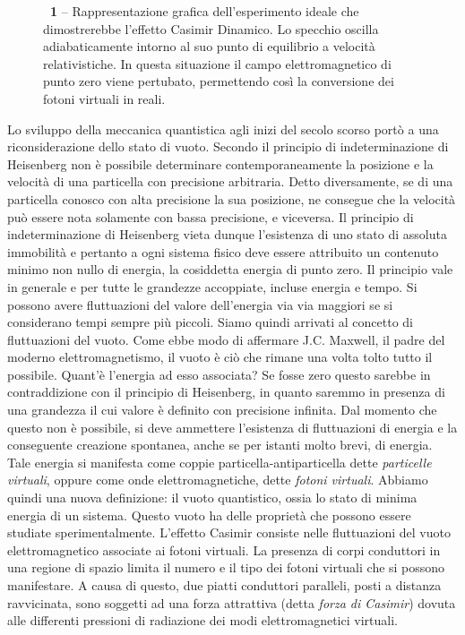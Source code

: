 \begin{figure}[!b]
\begin{center}
\caption{\textbf{\figurename~1} -- Rappresentazione grafica dell'esperimento ideale che dimostrerebbe l'effetto Casimir Dinamico. Lo specchio oscilla adiabaticamente intorno al suo punto di equilibrio a velocità relativistiche. In questa situazione il campo elettromagnetico di punto zero viene pertubato, permettendo così la conversione dei fotoni virtuali in reali.}
\label{fig:Im1}
\end{center}
\vskip-20pt
\end{figure}

Lo sviluppo della meccanica quantistica  agli inizi del secolo scorso portò a una riconsiderazione dello stato di vuoto. Secondo il principio di indeterminazione di Heisenberg non è possibile determinare contemporaneamente la posizione e la velocità di una particella con precisione arbitraria. Detto diversamente, se di una particella conosco con alta precisione la sua posizione, ne consegue che la velocità può essere nota solamente con bassa precisione, e viceversa. Il principio di indeterminazione di Heisenberg vieta dunque l'esistenza di uno stato di assoluta immobilità e pertanto a ogni sistema fisico deve essere attribuito un contenuto minimo non nullo di energia, la cosiddetta energia di punto zero. Il principio vale in generale e per tutte le grandezze accoppiate, incluse energia e tempo.
Si possono avere fluttuazioni del valore dell'energia via via maggiori se si considerano tempi sempre più piccoli.
Siamo quindi arrivati al concetto di fluttuazioni del vuoto. Come ebbe modo di affermare J.C. Maxwell, il padre del moderno elettromagnetismo, il vuoto è ciò che rimane una volta tolto tutto il possibile.
Quant'è l'energia ad esso associata? Se fosse zero questo sarebbe in contraddizione con il principio di Heisenberg, in quanto saremmo in presenza di una grandezza il cui valore è definito con precisione infinita. Dal momento che questo non è possibile, si deve ammettere l'esistenza di fluttuazioni di energia e la conseguente creazione spontanea, anche se per istanti molto brevi, di energia. Tale energia si manifesta come coppie particella-antiparticella dette \emph{particelle virtuali}, oppure come onde elettromagnetiche, dette \emph{fotoni virtuali}.
Abbiamo quindi una nuova definizione: il vuoto quantistico, ossia lo stato di minima energia di un sistema. Questo vuoto ha delle proprietà che possono essere studiate sperimentalmente. L'effetto Casimir \cite{Casimir} consiste nelle fluttuazioni del vuoto elettromagnetico associate ai fotoni virtuali. La presenza di corpi conduttori in una regione di spazio limita il numero e il tipo dei fotoni virtuali che si possono manifestare. A causa di questo, due piatti conduttori paralleli, posti a distanza ravvicinata, sono soggetti ad una forza attrattiva (detta \emph{forza di Casimir}) dovuta alle differenti pressioni di radiazione dei modi elettromagnetici virtuali.

